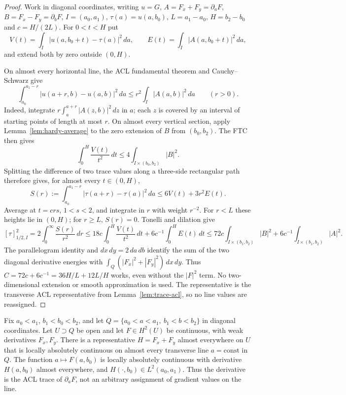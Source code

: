 \begin{proof}
\leanok
Work in diagonal coordinates, writing $u=G$,
$A=F_x+F_y=\partial_aF$, $B=F_x-F_y=\partial_bF$,
$I=(a_0,a_1)$, $\tau(a)=u(a,b_0)$, $L=a_1-a_0$,
$H=b_2-b_0$ and $c=H/(2L)$. For $0<t<H$ put
\[
 V(t)=\int_I|u(a,b_0+t)-\tau(a)|^2\,da,\qquad
 E(t)=\int_I|A(a,b_0+t)|^2\,da ,
\]
and extend both by zero outside $(0,H)$.

On almost every horizontal line, the ACL fundamental theorem and
Cauchy--Schwarz give
\[
 \int_{a_0}^{a_1-r}|u(a+r,b)-u(a,b)|^2\,da
 \le r^2\int_I|A(a,b)|^2\,da \qquad(r>0).
\]
Indeed, integrate $r\int_a^{a+r}|A(z,b)|^2\,dz$ in $a$;
each $z$ is covered by an interval of starting points of length at most $r$.
On almost every vertical section, apply Lemma~\ref{lem:hardy-average}
to the zero extension of $B$ from $(b_0,b_2)$. The FTC then gives
\[
 \int_0^H \frac{V(t)}{t^2}\,dt\le
 4\int_{I\times(b_0,b_2)}|B|^2 .
\]
Splitting the difference of two trace values along a three-side
rectangular path therefore gives, for almost every $t\in(0,H)$,
\[
 S(r):=\int_{a_0}^{a_1-r}|\tau(a+r)-\tau(a)|^2\,da
 \le 6V(t)+3r^2E(t).
\]
Average at $t=crs$, $1<s<2$, and integrate in $r$ with weight $r^{-2}$.
For $r<L$ these heights lie in $(0,H)$; for $r\ge L$, $S(r)=0$.
Tonelli and dilation give
\[
 [\tau]^2_{1/2,I}=2\int_0^\infty\frac{S(r)}{r^2}\,dr
 \le 18c\int_0^H\frac{V(t)}{t^2}\,dt
       +6c^{-1}\int_0^H E(t)\,dt
 \le 72c\int_{I\times(b_1,b_2)}|B|^2
       +6c^{-1}\int_{I\times(b_1,b_2)}|A|^2 .
\]
The parallelogram identity and $dx\,dy=2\,da\,db$ identify
the sum of the two diagonal derivative energies with
$\int_Q(|F_x|^2+|F_y|^2)\,dx\,dy$. Thus
$C=72c+6c^{-1}=36H/L+12L/H$ works, even without the $|F|^2$ term.
No two-dimensional extension or smooth approximation is used. The
representative is the transverse ACL representative from
Lemma~\ref{lem:trace-acl}, so no line values are reassigned.
\end{proof}

\begin{lemma}
\label{lem:trace-h2}
\leanok
Fix $a_0<a_1$, $b_1<b_0<b_2$, and let
$Q=\{a_0<a<a_1,\ b_1<b<b_2\}$ in diagonal coordinates.
Let $U\supset Q$ be open and let $F\in H^2(U)$ be continuous, with weak
derivatives $F_x,F_y$. There is a representative $H=F_x+F_y$ almost
everywhere on $U$ that is locally absolutely continuous on almost every
transverse line $a=\mathrm{const}$ in $Q$.
The function $a\mapsto F(a,b_0)$ is locally absolutely continuous with
derivative $H(a,b_0)$ almost everywhere, and
$H(\cdot,b_0)\in L^2(a_0,a_1)$. Thus the derivative is the ACL trace of
$\partial_aF$, not an arbitrary assignment of gradient values on the line.
\end{lemma}

